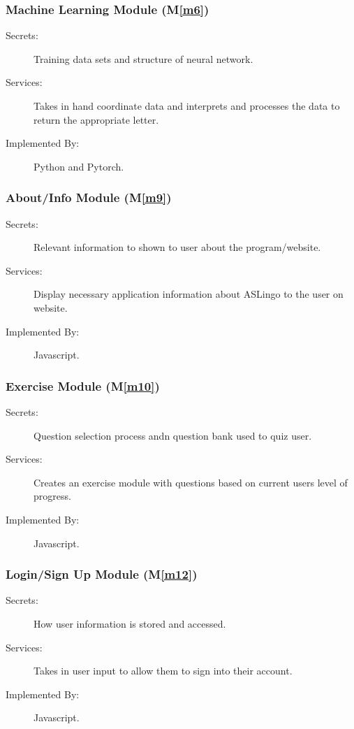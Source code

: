 \documentclass[12pt, titlepage]{article}
\newcommand{\mref}[1]{M\ref{#1}}
\begin{document}
\subsubsection{Machine Learning Module (\mref{m6})}
\begin{description}
\item[Secrets:] Training data sets and structure of neural network.
\item[Services:] Takes in hand coordinate data and interprets and processes the data to return the appropriate letter.
\item[Implemented By:] Python and Pytorch.
\end{description}

\subsubsection{About/Info Module (\mref{m9})}
\begin{description}
\item[Secrets:] Relevant information to shown to user about the program/website.
\item[Services:] Display necessary application information about ASLingo to the user on website.
\item[Implemented By:] Javascript.
\end{description}

\subsubsection{Exercise Module (\mref{m10})}
\begin{description}
\item[Secrets:] Question selection process andn question bank used to quiz user.
\item[Services:] Creates an exercise module with questions based on current users level of progress.
\item[Implemented By:] Javascript.
\end{description}

\subsubsection{Login/Sign Up Module (\mref{m12})}
\begin{description}
\item[Secrets:] How user information is stored and accessed.
\item[Services:] Takes in user input to allow them to sign into their account.
\item[Implemented By:] Javascript.
\end{description}
\end{document}
